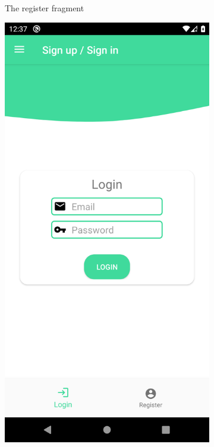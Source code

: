 \begin{figure}[H]
\begin{center}
\begin{subfigure}{.3\textwidth}
            \caption{The register fragment} 
        \end{subfigure}
        \begin{subfigure}{.3\textwidth}
            \includegraphics[scale=0.1, width=\textwidth]{_figures/login.png}

\end{subfigure}
\end{center}
\end{figure}
